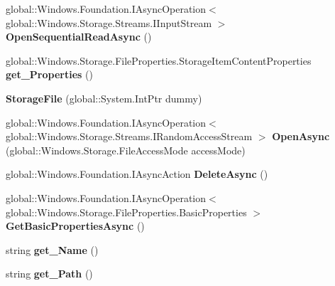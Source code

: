 \begin{DoxyCompactItemize}
global\+::\+Windows.\+Foundation.\+I\+Async\+Operation$<$ global\+::\+Windows.\+Storage.\+Streams.\+I\+Input\+Stream $>$ {\bfseries Open\+Sequential\+Read\+Async} ()
\item 
\mbox{\label{class_windows_1_1_storage_1_1_storage_file_a9a59e8a2f5bd44c25773662197b786bd}} 
global\+::\+Windows.\+Storage.\+File\+Properties.\+Storage\+Item\+Content\+Properties {\bfseries get\+\_\+\+Properties} ()
\item 
\mbox{\label{class_windows_1_1_storage_1_1_storage_file_a5c85dbe0011a81cc6ef4b8d88c05567e}} 
{\bfseries Storage\+File} (global\+::\+System.\+Int\+Ptr dummy)
\item 
\mbox{\label{class_windows_1_1_storage_1_1_storage_file_a29ee2f060ba92e79eabded8b48966776}} 
global\+::\+Windows.\+Foundation.\+I\+Async\+Operation$<$ global\+::\+Windows.\+Storage.\+Streams.\+I\+Random\+Access\+Stream $>$ {\bfseries Open\+Async} (global\+::\+Windows.\+Storage.\+File\+Access\+Mode access\+Mode)
\item 
\mbox{\label{class_windows_1_1_storage_1_1_storage_file_a6d0d928c1dc9abd71b250099c2de27f1}} 
global\+::\+Windows.\+Foundation.\+I\+Async\+Action {\bfseries Delete\+Async} ()
\item 
\mbox{\label{class_windows_1_1_storage_1_1_storage_file_acf51ed8048b0f4497f173a6c8addf43f}} 
global\+::\+Windows.\+Foundation.\+I\+Async\+Operation$<$ global\+::\+Windows.\+Storage.\+File\+Properties.\+Basic\+Properties $>$ {\bfseries Get\+Basic\+Properties\+Async} ()
\item 
\mbox{\label{class_windows_1_1_storage_1_1_storage_file_a7a2ef38514c8d6dc439918de9aa6feb7}} 
string {\bfseries get\+\_\+\+Name} ()
\item 
\mbox{\label{class_windows_1_1_storage_1_1_storage_file_ad961bebed52f4f6b04a97201c511e841}} 
string {\bfseries get\+\_\+\+Path} ()
\item 
\mbox{\label{class_windows_1_1_storage_1_1_storage_file_aab7da0a2a5ea0ef0219616c0ebbf92e7}} 

\end{DoxyCompactItemize}
